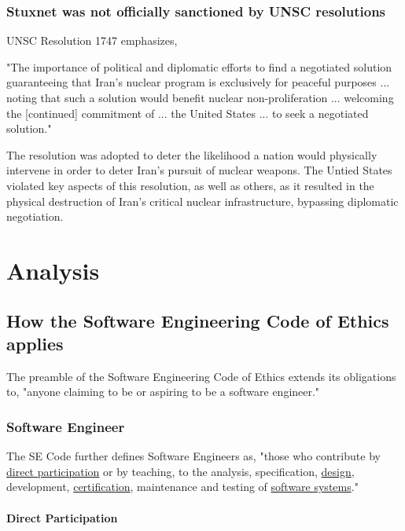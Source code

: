 \documentclass[12pt]{article}
\begin{document}
\begin{multicols}{2}
\subsubsection{Stuxnet was not officially sanctioned by UNSC resolutions}

UNSC Resolution 1747 emphasizes,
\begin{displayquote}
"The importance of political and diplomatic efforts to find a negotiated solution guaranteeing that Iran’s nuclear program is exclusively for peaceful purposes ... noting that such a solution would benefit nuclear non-proliferation ... welcoming the [continued] commitment of ... the United States ... to seek a negotiated solution."\cite{resolution1747}
\end{displayquote}

The resolution was adopted to deter the likelihood a nation would physically intervene in order to deter Iran's pursuit of nuclear weapons. The Untied States violated key aspects of this resolution, as well as others, as it resulted in the physical destruction of Iran's critical nuclear infrastructure, bypassing diplomatic negotiation.


\section{Analysis}

\subsection{How the Software Engineering Code of Ethics applies}

The preamble of the Software Engineering Code of Ethics extends its obligations to, "anyone claiming to be or aspiring to be a software engineer."\cite{softwareEngineeringCodeOfEthics}

\subsubsection{Software Engineer}

The SE Code further defines Software Engineers as, "those who contribute by \underline{direct participation} or by teaching, to the analysis, specification, \underline{design}, development, \underline{certification}, maintenance and testing of \underline{software systems}."

\paragraph{Direct Participation}


\end{multicols}
\end{document}

